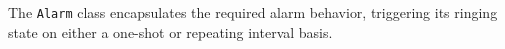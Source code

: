 
The {\tt Alarm} class encapsulates the required alarm behavior, triggering
its ringing state on either a one-shot or repeating interval basis.

